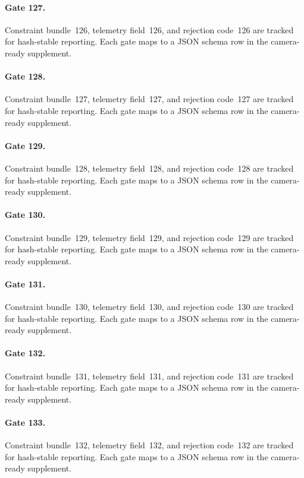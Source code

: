 \documentclass[sigconf,nonacm]{acmart}
\begin{document}
\paragraph{Gate 127.}
Constraint bundle~126, telemetry field~126, and rejection code~126 are tracked for hash-stable reporting. Each gate maps to a JSON schema row in the camera-ready supplement. %

\paragraph{Gate 128.}
Constraint bundle~127, telemetry field~127, and rejection code~127 are tracked for hash-stable reporting. Each gate maps to a JSON schema row in the camera-ready supplement. %

\paragraph{Gate 129.}
Constraint bundle~128, telemetry field~128, and rejection code~128 are tracked for hash-stable reporting. Each gate maps to a JSON schema row in the camera-ready supplement. %

\paragraph{Gate 130.}
Constraint bundle~129, telemetry field~129, and rejection code~129 are tracked for hash-stable reporting. Each gate maps to a JSON schema row in the camera-ready supplement. %

\paragraph{Gate 131.}
Constraint bundle~130, telemetry field~130, and rejection code~130 are tracked for hash-stable reporting. Each gate maps to a JSON schema row in the camera-ready supplement. %

\paragraph{Gate 132.}
Constraint bundle~131, telemetry field~131, and rejection code~131 are tracked for hash-stable reporting. Each gate maps to a JSON schema row in the camera-ready supplement. %

\paragraph{Gate 133.}
Constraint bundle~132, telemetry field~132, and rejection code~132 are tracked for hash-stable reporting. Each gate maps to a JSON schema row in the camera-ready supplement. %
\end{document}
